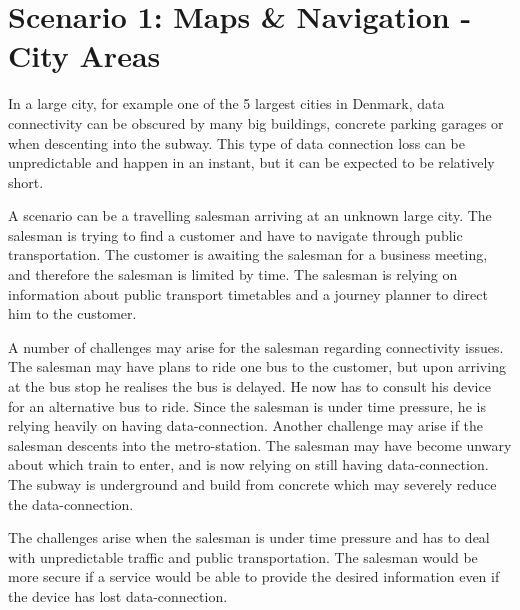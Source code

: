 \section{Scenario 1: Maps \& Navigation - City Areas}
In a large city, for example one of the 5 largest cities in Denmark, data connectivity can be obscured by many big buildings, concrete parking garages or when descenting into the subway. This type of data connection loss can be unpredictable and happen in an instant, but it can be expected to be relatively short. 

A scenario can be a travelling salesman arriving at an unknown large city. The salesman is trying to find a customer and have to navigate through public transportation. The customer is awaiting the salesman for a business meeting, and therefore the salesman is limited by time. The salesman is relying on information about public transport timetables and a journey planner to direct him to the customer. 

A number of challenges may arise for the salesman regarding connectivity issues. The salesman may have plans to ride one bus to the customer, but upon arriving at the bus stop he realises the bus is delayed. He now has to consult his device for an alternative bus to ride. Since the salesman is under time pressure, he is relying heavily on having data-connection. Another challenge may arise if the salesman descents into the metro-station. The salesman may have become unwary about which train to enter, and is now relying on still having data-connection. The subway is underground and build from concrete which may severely reduce the data-connection. 

The challenges arise when the salesman is under time pressure and has to deal with unpredictable traffic and public transportation. The salesman would be more secure if a service would be able to provide the desired information even if the device has lost data-connection.